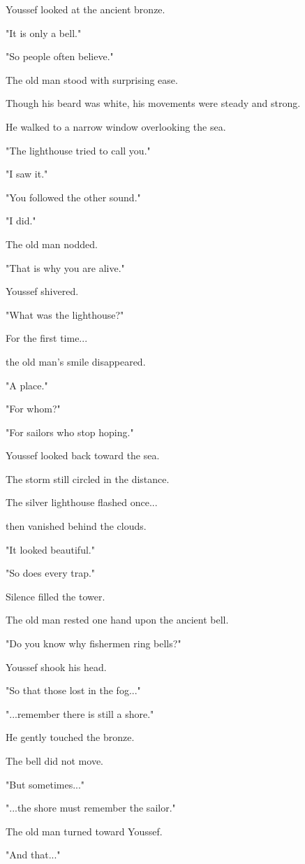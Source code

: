 \documentclass[12pt,openany]{book}
\begin{document}
Youssef looked at the ancient bronze.

"It is only a bell."

"So people often believe."

The old man stood with surprising ease.

Though his beard was white, his movements were steady and strong.

He walked to a narrow window overlooking the sea.

"The lighthouse tried to call you."

"I saw it."

"You followed the other sound."

"I did."

The old man nodded.

"That is why you are alive."

Youssef shivered.

"What was the lighthouse?"

For the first time...

the old man's smile disappeared.

"A place."

"For whom?"

"For sailors who stop hoping."

Youssef looked back toward the sea.

The storm still circled in the distance.

The silver lighthouse flashed once...

then vanished behind the clouds.

"It looked beautiful."

"So does every trap."

Silence filled the tower.

The old man rested one hand upon the ancient bell.

"Do you know why fishermen ring bells?"

Youssef shook his head.

"So that those lost in the fog..."

"...remember there is still a shore."

He gently touched the bronze.

The bell did not move.

"But sometimes..."

"...the shore must remember the sailor."

The old man turned toward Youssef.

"And that..."
\end{document}
